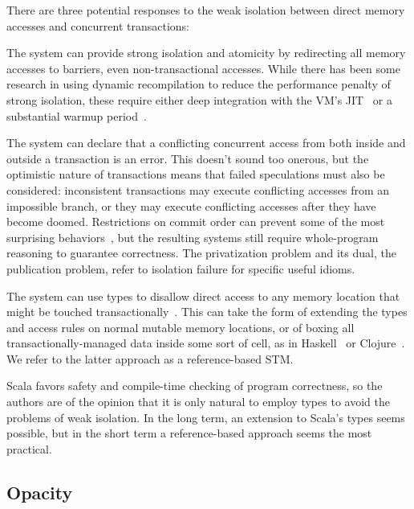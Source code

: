 There are three potential responses to the weak isolation between direct memory
accesses and concurrent transactions:
\begin{packed_itemize}

\item The system can provide strong isolation and atomicity by redirecting
all memory accesses to barriers, even non-transactional accesses.
While there has been some research in using dynamic recompilation
to reduce the performance penalty of strong isolation, these require
either deep integration with the VM's JIT~\cite{schneider08dynamic}
or a substantial warmup period~\cite{bronson09dbo}.

\item The system can declare that a conflicting concurrent access
from both inside and outside a transaction is an error.  This doesn't
sound too onerous, but the optimistic nature of transactions means that
failed speculations must also be considered: inconsistent transactions
may execute conflicting accesses from an impossible branch, or they
may execute conflicting accesses after they have become doomed.
Restrictions on commit order can prevent some of the most surprising
behaviors~\cite{sgla08}, but the resulting systems still require
whole-program reasoning to guarantee correctness.  The privatization
problem and its dual, the publication problem, refer to isolation failure
for specific useful idioms.

\item The system can use types to disallow direct access to any memory
location that might be touched transactionally~\cite{moore08semantics}.
This can take the form of extending the types and access rules on normal
mutable memory locations, or of boxing all transactionally-managed
data inside some sort of cell, as in Haskell~\cite{harris05composable}
or Clojure~\cite{hickey08clojure}.  We refer to the latter approach as
a reference-based STM.

\end{packed_itemize}

Scala favors safety and compile-time checking of program correctness,
so the authors are of the opinion that it is only natural to employ types
to avoid the problems of weak isolation.  In the long term, an extension
to Scala's types seems possible, but in the short term a reference-based
approach seems the most practical.

\subsection{Opacity}

